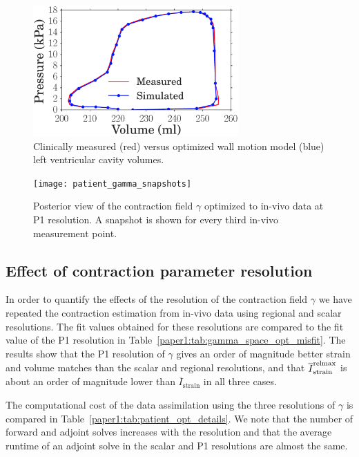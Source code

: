 \begin{figure}[htbp]
\centering
    \includegraphics[width=0.7\textwidth]{simulated_pv_loop}
\caption{Clinically measured (red) versus optimized wall motion model
  (blue) left ventricular cavity volumes.}
\label{paper1:fig:pv_match}
\end{figure}

\begin{figure}[htbp]
\centering
    \texttt{[image: patient\_gamma\_snapshots]}
\caption{Posterior view of the contraction field $\gamma$ optimized to in-vivo data 
at P1 resolution. A snapshot is shown for every third in-vivo measurement point.}
\label{paper1:fig:snap_shots}
\end{figure}


\subsection{Effect of contraction parameter resolution}
In order to quantify the effects of the resolution of the contraction field $\gamma$
we have repeated the contraction estimation from in-vivo data using regional and scalar resolutions.
The fit values obtained for these resolutions are compared to the fit value of the P1 resolution in Table~\ref{paper1:tab:gamma_space_opt_misfit}.
The results show that the P1 resolution of $\gamma$ gives an order of magnitude better strain and volume
matches than the scalar and regional resolutions, and that $\overline{I}^{\text{relmax}}_{\text{strain}}$
is about an order of magnitude lower than $\overline{I}_{\mathrm{strain}}$ in all three cases.

The computational cost of the data assimilation using the three resolutions of $\gamma$ is compared in 
Table~\ref{paper1:tab:patient_opt_details}. We note that the number of forward and adjoint solves 
increases with the resolution and that the average runtime of an adjoint solve in the scalar and P1 resolutions
are almost the same.

